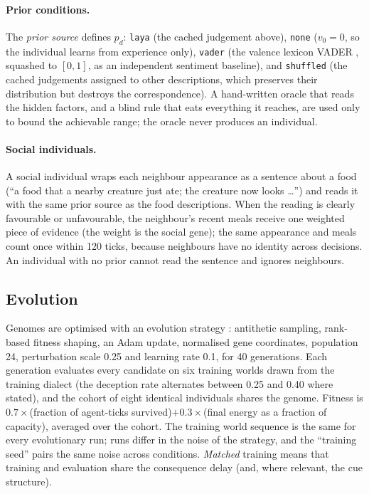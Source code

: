 \paragraph{Prior conditions.}
The \emph{prior source} defines $p_d$: \texttt{laya} (the cached judgement above), \texttt{none} ($v_0=0$, so the individual learns from experience only), \texttt{vader} (the valence lexicon VADER , squashed to $[0,1]$, as an independent sentiment baseline), and \texttt{shuffled} (the cached judgements assigned to other descriptions, which preserves their distribution but destroys the correspondence). A hand-written oracle that reads the hidden factors, and a blind rule that eats everything it reaches, are used only to bound the achievable range; the oracle never produces an individual.

\paragraph{Social individuals.}
A social individual wraps each neighbour appearance as a sentence about a food (``a food that a nearby creature just ate; the creature now looks \dots'') and reads it with the same prior source as the food descriptions. When the reading is clearly favourable or unfavourable, the neighbour's recent meals receive one weighted piece of evidence (the weight is the social gene); the same appearance and meals count once within 120 ticks, because neighbours have no identity across decisions. An individual with no prior cannot read the sentence and ignores neighbours.

\subsection{Evolution}
\label{sec:evolution}
Genomes are optimised with an evolution strategy : antithetic sampling, rank-based fitness shaping, an Adam update, normalised gene coordinates, population 24, perturbation scale 0.25 and learning rate 0.1, for 40 generations. Each generation evaluates every candidate on six training worlds drawn from the training dialect (the deception rate alternates between 0.25 and 0.40 where stated), and the cohort of eight identical individuals shares the genome. Fitness is $0.7\times$(fraction of agent-ticks survived)$+0.3\times$(final energy as a fraction of capacity), averaged over the cohort. The training world sequence is the same for every evolutionary run; runs differ in the noise of the strategy, and the ``training seed'' pairs the same noise across conditions. \emph{Matched} training means that training and evaluation share the consequence delay (and, where relevant, the cue structure).

